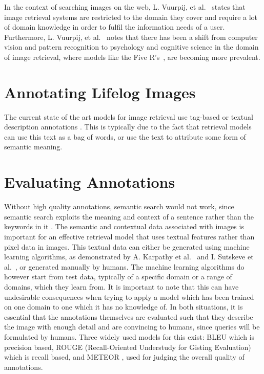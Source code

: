 In the context of searching images on the web,  L. Vuurpij, et al.~\cite{vuurpij2002vind} states that image retrieval systems are restricted to the domain they cover and require a lot of domain knowledge in order to fulfil the information needs of a user. Furthermore, L. Vuurpij, et al.~\cite{vuurpij2002vind} notes that there has been a shift from computer vision and pattern recognition to psychology and cognitive science in the domain of image retrieval, where models like the Five R's~\cite{gurrin2014lifelogging}, are becoming more prevalent. 

\section{Annotating Lifelog Images}
The current state of the art models for image retrieval use tag-based or textual description annotations \cite{ali2010semantically}. This is typically due to the fact that retrieval models can use this text as a bag of words, or use the text to attribute some form of semantic meaning.

\section{Evaluating Annotations}
Without high quality annotations, semantic search would not work, since semantic search exploits the meaning and context of a sentence rather than the keywords in it \cite{ali2010semantically}. The semantic and contextual data associated with images is important for an effective retrieval model that uses textual features rather than pixel data in images. This textual data can either be generated using machine learning algorithms, as demonstrated by A. Karpathy et al.~\cite{karpathy2015deep} and  I. Sutskeve et al.~\cite{sutskever2011generating}, or generated manually by humans. The machine learning algorithms do however start from test data, typically of a specific domain or a range of domains, which they learn from. It is important to note that this can have undesirable consequences when trying to apply a model which has been trained on one domain to one which it has no knowledge of. In both situations, it is essential that the annotations themselves are evaluated such that they describe the image with enough detail and are convincing to humans, since queries will be formulated by humans. Three widely used models for this exist: BLEU \cite{papineni2002bleu} which is precision based, ROUGE (Recall-Oriented Understudy for Gisting Evaluation) \cite{lin2004rouge} which is recall based, and METEOR \cite{elliott2013image}, used for judging the overall quality of annotations.

